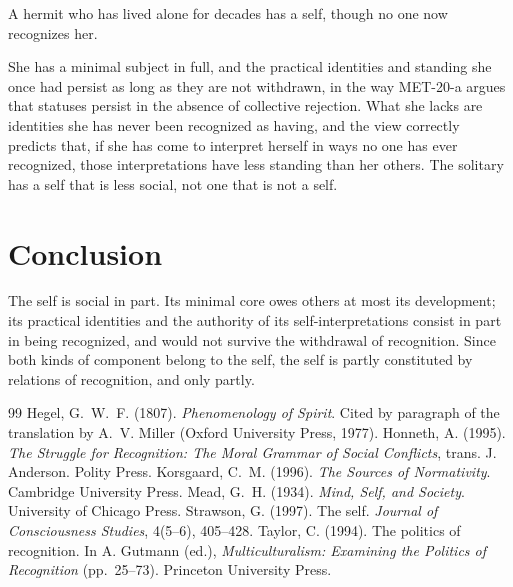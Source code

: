 \documentclass{situationist-preprint}
\begin{document}
\begin{objection}
A hermit who has lived alone for decades has a self, though no one now recognizes her.
\end{objection}

\begin{reply}
She has a minimal subject in full, and the practical identities and standing she once had persist as long as they are not withdrawn, in the way MET-20-a argues that statuses persist in the absence of collective rejection. What she lacks are identities she has never been recognized as having, and the view correctly predicts that, if she has come to interpret herself in ways no one has ever recognized, those interpretations have less standing than her others. The solitary has a self that is less social, not one that is not a self.
\end{reply}

\section{Conclusion}

The self is social in part. Its minimal core owes others at most its development; its practical identities and the authority of its self-interpretations consist in part in being recognized, and would not survive the withdrawal of recognition. Since both kinds of component belong to the self, the self is partly constituted by relations of recognition, and only partly.

\begin{thebibliography}{99}\small
{} Hegel, G.~W.~F. (1807). \emph{Phenomenology of Spirit}. Cited by paragraph of the translation by A.~V. Miller (Oxford University Press, 1977).
 Honneth, A. (1995). \emph{The Struggle for Recognition: The Moral Grammar of Social Conflicts}, trans. J. Anderson. Polity Press.
 Korsgaard, C.~M. (1996). \emph{The Sources of Normativity}. Cambridge University Press.
 Mead, G.~H. (1934). \emph{Mind, Self, and Society}. University of Chicago Press.
 Strawson, G. (1997). The self. \emph{Journal of Consciousness Studies}, 4(5--6), 405--428.
 Taylor, C. (1994). The politics of recognition. In A. Gutmann (ed.), \emph{Multiculturalism: Examining the Politics of Recognition} (pp.~25--73). Princeton University Press.
\end{thebibliography}
\end{document}
